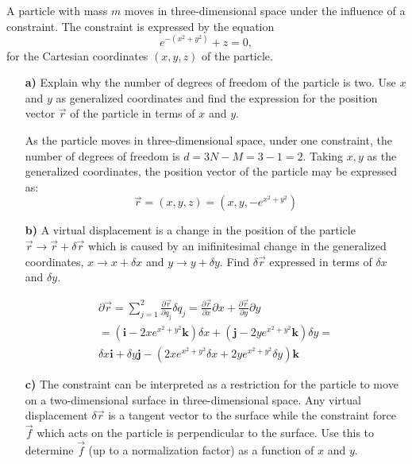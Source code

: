 \documentclass[11pt,a4paper]{report}
\newcounter{excount}[chapter]
\newenvironment{exercise}[1][]{\addtocounter{excount}{1} \noindent {\bf Problem
    \arabic{excount} \ \ #1}\hspace{2mm}}{\vspace{4mm}}
\begin{document}
\begin{exercise}
A particle with mass $m$ moves in three-dimensional space under the influence of a constraint. The constraint is expressed by the equation
\begin{equation}
e^{-(x^2+y^2)}+z=0,
\label{eq:4.const}
\end{equation}
for the Cartesian coordinates $(x,y,z)$ of the particle.
\begin{itemize}
\item[\bf a)]Explain why the number of degrees of freedom of the particle is two. Use $x$ and $y$ as generalized coordinates and find the expression for the position vector $\vec r$ of the particle in terms of $x$ and $y$.  

\vspace{5mm} %
As the particle moves in three-dimensional space, under one constraint, the number of degrees of freedom is $d=3N-M=3-1=2$. Taking $x,y$ as the generalized coordinates, the position vector of the particle may be expressed as: \newline
\begin{equation}
\vec{r}=(x,y,z)=(x,y,-e^{x^2+y^2})
\label{eq:4.gencoord}
\end{equation}

\item[\bf b)]A virtual displacement is a change in the position of the particle $\vec r \to \vec r + \delta \vec r$ which is caused by an inifinitesimal change in the generalized coordinates, $x \to x + \delta x$ and $y\to y+\delta y$. Find $\delta \vec r$ expressed in terms of $\delta x$ and $\delta y$.


\vspace{5mm} %
\begin{align*}
\partial\vec{r}=\sum_{j=1}^{2} \frac{\partial \vec{r}}{\partial q_j} \delta q_j= \frac{\partial \vec{r}}{\partial x} \partial x +\frac{\partial \vec{r}}{\partial y} \partial y \\
=( \mathbf{i} -2xe^{x^2+y^2} \mathbf{k})\delta x+(\mathbf{j} -2ye^{x^2+y^2} \mathbf{k})\delta y=\\
 \delta x \mathbf{i} + \delta y \mathbf{j} -( 2xe^{x^2+y^2} \delta x + 2ye^{x^2+y^2} \delta y) \mathbf{k}
\end{align*}

\item[\bf c)]The constraint can be interpreted as a restriction for the particle to move on a two-dimensional surface in three-dimensional space. Any virtual displacement $\delta \vec r$ is a tangent vector to the surface while the constraint force $\vec f$ which acts on the particle is perpendicular to the surface. Use this to determine $\vec f $ (up to a normalization factor) as a function of $x$ and $y$.


\end{itemize}
\end{exercise}
\end{document}
